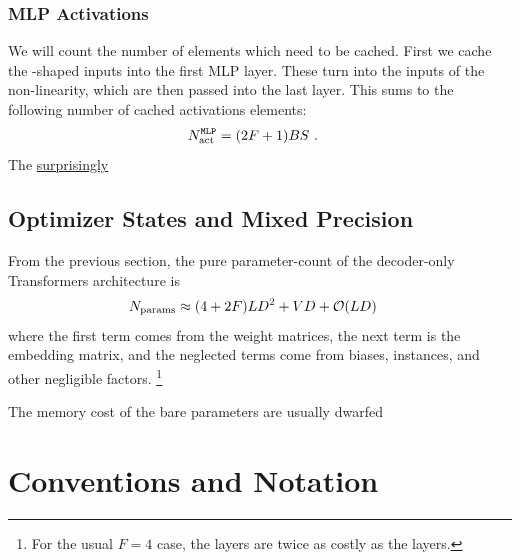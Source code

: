 \documentclass[11pt]{article}
\begin{document}
\subsubsection{MLP Activations}

We will count the number of elements which need to be cached.  First we cache the
-shaped inputs into the first MLP layer. These turn into the
 inputs of the non-linearity, which are then passed into the last
 layer. This sums to the following number of cached activations elements:
\begin{align}
N _{ \rm act  } ^\texttt{MLP} &= (2F+1)BS \ .
\end{align}
The
\href{https://github.com/pytorch/pytorch/issues/41571}{surprisingly}








\subsection{Optimizer States and Mixed Precision}

From the previous section, the pure parameter-count of the decoder-only Transformers
architecture is
\begin{align}
    N _{ \rm params } &\approx  (4 + 2F) L D ^{ 2 } + VD +  \mathcal{O}( LD)
\end{align}
where the first term comes from the  weight matrices, the next term is
the embedding matrix, and the neglected terms come from biases,  instances, and
other negligible factors. \footnote{For the usual $ F=4 $ case, the  layers are twice as costly
as the  layers.}

The memory cost of the bare parameters are usually dwarfed





\appendix


\section{Conventions and Notation}\label{app:conventions}
\end{document}
